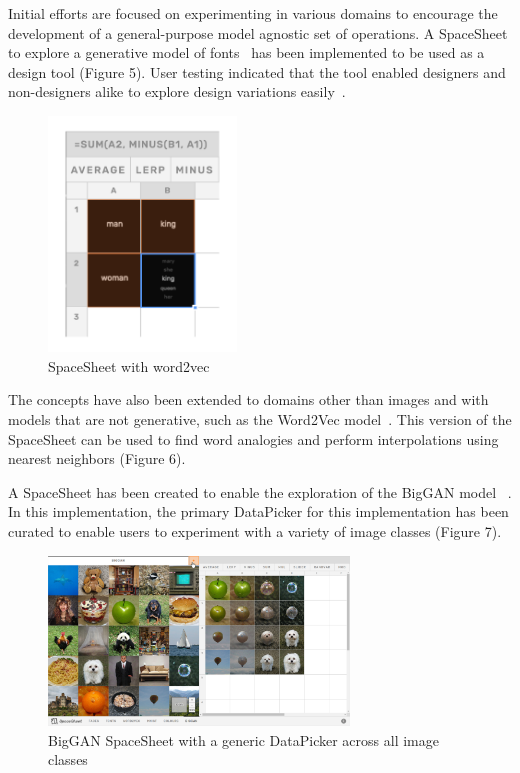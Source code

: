 \documentclass[letterpaper]{article}
\begin{document}
Initial efforts are focused on experimenting in various domains to encourage the development of a general-purpose model agnostic set of operations. A SpaceSheet to explore a generative model of fonts~\cite{bernhardsson15} has been implemented to be used as a design tool (Figure 5). User testing indicated that the tool enabled designers and non-designers alike to explore design variations easily~\cite{loh18}.

\begin{figure}[ht]
  \centering
  \includegraphics[width=5cm]{figs/02C-use-cases.png}
  \caption{SpaceSheet with word2vec}
\end{figure}


The concepts have also been extended to domains other than images and with models that are not generative, such as the Word2Vec model~\cite{word2vec}. This version of the SpaceSheet can be used to find word analogies and perform interpolations using nearest neighbors (Figure 6).

A SpaceSheet has been created to enable the exploration of the BigGAN model ~\cite{brock18}. In this implementation, the primary DataPicker for this implementation has been curated to enable users to experiment with a variety of image classes (Figure 7).

\begin{figure}[ht]
  \centering
  \includegraphics[width=8cm]{figs/BigGAN-01.png}
  \caption{BigGAN SpaceSheet with a generic DataPicker across all image classes}
\end{figure}
\end{document}
